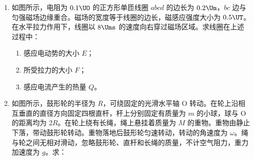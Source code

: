 \documentclass[\gkver]{gaokaozhenti}
\begin{document}
\begin{enumerate}
{（2）光纤通信利用了光的全反射现象，光由光密介质射入光疏介质时才会发生全反射，所以光纤内芯的折射率比外套的大；该内芯的折射率为 $n=\frac{1}{\sin C}=\frac{1}{\sin43^{\circ}}=\frac{1}{0.68}\approx1.5$。

（3）电磁波在土壤中的传播速度 $v=f\lambda$，由题意得 $2d=v\Delta t$，解得 $d=\frac{f\lambda\Delta t}{2}$。
}

\item
如图所示，电阻为 $0.1\UO$ 的正方形单匝线圈 $abcd$ 的边长为 $0.2\Um$，$bc$ 边与匀强磁场边缘重合。磁场的宽度等于线圈的边长，磁感应强度大小为 $0.5\UT$。在水平拉力作用下，线圈以 $8\Ums$ 的速度向右穿过磁场区域。求线圈在上述过程中：

\begin{enumerate}
\item
感应电动势的大小 $E$；
\item
所受拉力的大小 $F$；
\item
感应电流产生的热量 $Q$。
\end{enumerate}

\onepicture[align=right, w=8.26cm]{}

\jdanswer{
\begin{enumerate}
\item
$0.8\UV$
\item
$0.8\UN$
\item
$0.32\UJ$
\end{enumerate}
}


\item
如图所示，鼓形轮的半径为 $R$，可绕固定的光滑水平轴 O 转动。在轮上沿相互垂直的直径方向固定四根直杆，杆上分别固定有质量为 $m$ 的小球，球与 O 的距离均为 2$R$。在轮上绕有长绳，绳上悬挂着质量为 $M$ 的重物。重物由静止下落，带动鼓形轮转动。重物落地后鼓形轮匀速转动，转动的角速度为 $\omega$。绳与轮之间无相对滑动，忽略鼓形轮、直杆和长绳的质量，不计空气阻力，重力加速度为 $g$。求：


\end{enumerate}
\end{document}
